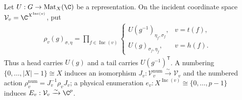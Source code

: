 \begin{definition}%
    \label{def:peps_semiregular_incident_action}
    \leanok
    Let $U:G\to\operatorname{Mat}_X(\C)$ be a representation.
    On the incident coordinate space $\mathcal V_v=\C^{X^{\operatorname{Inc}(v)}}$,
    put
    \begin{align}
        \rho_v(g)_{\sigma,\eta}
        =\prod_{f\in\operatorname{Inc}(v)}
        \begin{cases}
            U(g^{-1})_{\eta_f,\sigma_f}, & v=t(f), \\
            U(g)_{\sigma_f,\eta_f},      & v=h(f).
        \end{cases}
        \label{eq:peps_semiregular_incident_action}
    \end{align}
    Thus a head carries $U(g)$ and a tail carries $U(g^{-1})^{\mathsf T}$.
    A numbering $\{0,\ldots,|X|-1\}\cong X$ induces an isomorphism
    $J_v:\mathcal V_v^{\mathrm{num}}\xrightarrow{\sim}\mathcal V_v$ and the
    numbered action $\rho_v^{\mathrm{num}}=J_v^{-1}\rho_vJ_v$; a physical
    enumeration $e_v:X^{\operatorname{Inc}(v)}\cong\{0,\ldots,p-1\}$ induces
    $E_v:\mathcal V_v\xrightarrow{\sim}\C^p$.
\end{definition}

